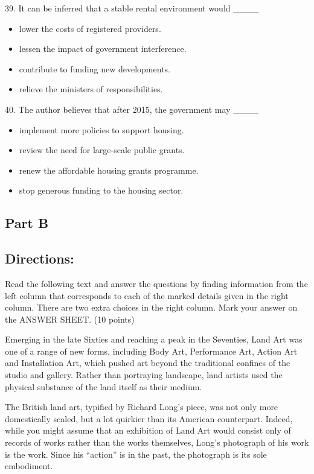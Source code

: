 \documentclass[UTF8,11pt]{ctexart}
\begin{document}
39. It can be inferred that a stable rental environment would \_\_\_\_


\begin{itemize}[leftmargin=2em,itemsep=.2em,topsep=.4em]\item[A.] lower the costs of registered providers.
\item[B.] lessen the impact of government interference.
\item[C.] contribute to funding new developments.
\item[D.] relieve the ministers of responsibilities.
\end{itemize}

40. The author believes that after 2015, the government may \_\_\_\_


\begin{itemize}[leftmargin=2em,itemsep=.2em,topsep=.4em]\item[A.] implement more policies to support housing.
\item[B.] review the need for large-scale public grants.
\item[C.] renew the affordable housing grants programme.
\item[D.] stop generous funding to the housing sector.
\end{itemize}

\subsection*{\textbf{Part B}}


\subsection*{\textbf{Directions:}}


Read the following text and answer the questions by finding information from the left column that corresponds to each of the marked details given in the right column. There are two extra choices in the right column. Mark your answer on the ANSWER SHEET. (10 points)


Emerging in the late Sixties and reaching a peak in the Seventies, Land Art was one of a range of new forms, including Body Art, Performance Art, Action Art and Installation Art, which pushed art beyond the traditional confines of the studio and gallery. Rather than portraying landscape, land artists used the physical substance of the land itself as their medium.


The British land art, typified by Richard Long’s piece, was not only more domestically scaled, but a lot quirkier than its American counterpart. Indeed, while you might assume that an exhibition of Land Art would consist only of records of works rather than the works themselves, Long’s photograph of his work is the work. Since his “action” is in the past, the photograph is its sole embodiment.
\end{document}
